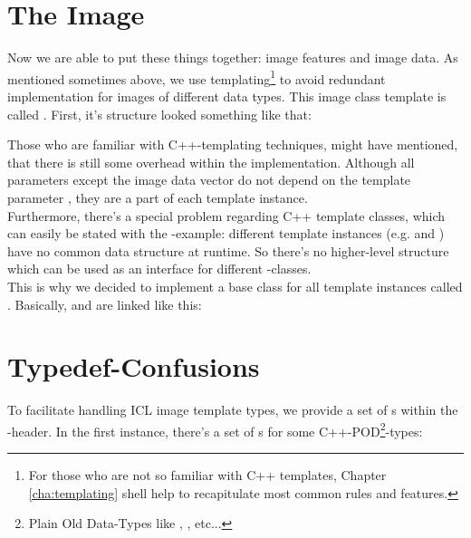 \section{The Image}
Now we are able to put these things together: image features and image data. As mentioned sometimes above, we use templating\footnote{For those who are not so familiar with C++ templates, Chapter \ref{cha:templating} shell help to recapitulate most common rules and features.} to avoid redundant implementation for images of different data types. This image class template is called  . First, it's structure looked something like that:


Those who are familiar with C++-templating techniques, might have mentioned, that there is still some overhead within the implementation. Although all parameters except the image data vector do not depend on the template parameter , they are a part of each template instance.\\
Furthermore, there's a special problem regarding C++ template classes, which can easily be stated with the -example: different template instances (e.g.  and ) have no common data structure at runtime. So there's no higher-level structure which can be used as an interface for different -classes.\\
This is why we decided to implement a base class for all  template instances called  . Basically,  and  are linked like this:



\section{Typedef-Confusions}
To facilitate handling ICL image template types, we provide a set of s within the -header. In the first instance, there's a set of s for some C++-POD\footnote{Plain Old Data-Types like , ,  etc...}-types:


